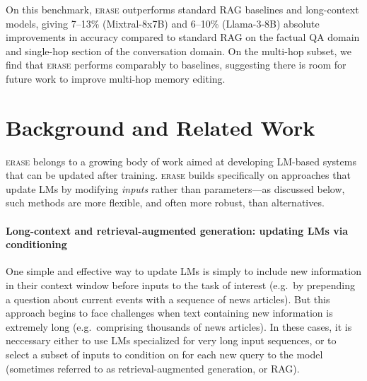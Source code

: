 \documentclass[11pt]{article}
\newcommand{\ourmethod}{\textsc{erase}\xspace}
\begin{document}
On this benchmark, \ourmethod outperforms standard RAG baselines and long-context models, giving 
7--13\%
(Mixtral-8x7B) and 
6--10\%
(Llama-3-8B) absolute improvements in accuracy %
compared to standard RAG on the factual QA domain and single-hop section of the conversation domain. On the multi-hop subset, we find that \ourmethod performs comparably to baselines, suggesting there is room for future work to improve multi-hop memory editing.






























\section{Background and Related Work}

\ourmethod belongs to a growing body of work aimed at developing LM-based systems that can be updated after training. \ourmethod builds specifically on approaches that update LMs by modifying \emph{inputs} rather than parameters---as discussed below, such methods are more flexible, and often more robust, than alternatives. 

\paragraph{Long-context and retrieval-augmented generation: updating LMs via conditioning} 
One simple and effective way to update LMs is simply to include new information in their context window before inputs to the task of interest (e.g.\ by prepending a question about current events with a sequence of news articles). 
But this approach begins to face challenges when text containing new information is extremely long (e.g.\ comprising thousands of news articles). In these cases, it is neccessary either to use LMs specialized for very long input sequences, or to select a subset of inputs to condition on for each new query to the model (sometimes referred to as retrieval-augmented generation, or RAG). 
\end{document}
